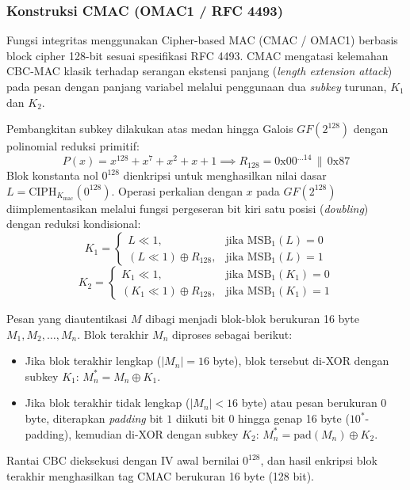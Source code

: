 \subsubsection{Konstruksi CMAC (OMAC1 / RFC 4493)}
Fungsi integritas menggunakan Cipher-based MAC (CMAC / OMAC1) berbasis block cipher 128-bit sesuai spesifikasi RFC 4493. CMAC mengatasi kelemahan CBC-MAC klasik terhadap serangan ekstensi panjang (\textit{length extension attack}) pada pesan dengan panjang variabel melalui penggunaan dua \textit{subkey} turunan, $K_1$ dan $K_2$.

Pembangkitan subkey dilakukan atas medan hingga Galois $GF(2^{128})$ dengan polinomial reduksi primitif:
\[
P(x) = x^{128} + x^7 + x^2 + x + 1 \implies R_{128} = \text{0x00}^{\dots 14} \,\|\, \text{0x87}
\]
Blok konstanta nol $0^{128}$ dienkripsi untuk menghasilkan nilai dasar $L = \text{CIPH}_{K_{\text{mac}}}(0^{128})$. Operasi perkalian dengan $x$ pada $GF(2^{128})$ diimplementasikan melalui fungsi pergeseran bit kiri satu posisi (\textit{doubling}) dengan reduksi kondisional:
\[
K_1 = \begin{cases}
L \ll 1, & \text{jika } \text{MSB}_1(L) = 0 \\
(L \ll 1) \oplus R_{128}, & \text{jika } \text{MSB}_1(L) = 1
\end{cases}
\]
\[
K_2 = \begin{cases}
K_1 \ll 1, & \text{jika } \text{MSB}_1(K_1) = 0 \\
(K_1 \ll 1) \oplus R_{128}, & \text{jika } \text{MSB}_1(K_1) = 1
\end{cases}
\]

Pesan yang diautentikasi $M$ dibagi menjadi blok-blok berukuran 16 byte $M_1, M_2, \dots, M_n$. Blok terakhir $M_n$ diproses sebagai berikut:
\begin{itemize}
    \item Jika blok terakhir lengkap ($|M_n| = 16$ byte), blok tersebut di-XOR dengan subkey $K_1$: $M_n^* = M_n \oplus K_1$.
    \item Jika blok terakhir tidak lengkap ($|M_n| < 16$ byte) atau pesan berukuran 0 byte, diterapkan \textit{padding} bit $1$ diikuti bit $0$ hingga genap 16 byte ($10^*$-padding), kemudian di-XOR dengan subkey $K_2$: $M_n^* = \text{pad}(M_n) \oplus K_2$.
\end{itemize}
Rantai CBC dieksekusi dengan IV awal bernilai $0^{128}$, dan hasil enkripsi blok terakhir menghasilkan tag CMAC berukuran 16 byte (128 bit).

